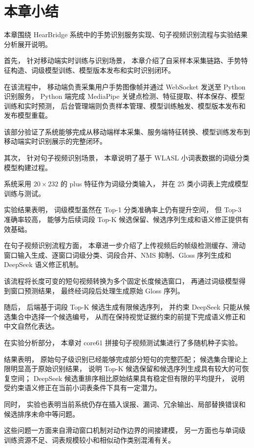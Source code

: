 
\section{本章小结}

本章围绕 HearBridge 系统中的手势识别服务实现、句子视频识别流程与实验结果分析展开说明。

首先，
针对移动端实时训练与识别场景，
本章介绍了自采样本采集链路、手势特征构造、词级模型训练、模型版本发布和实时识别闭环。

在该流程中，
移动端负责采集用户手势图像帧并通过 WebSocket 发送至 Python 识别服务，
Python 端完成 MediaPipe 关键点检测、特征提取、样本保存、模型训练和实时预测，
后台管理端则负责样本管理、模型训练触发、模型版本发布和发布模型重载。

该部分验证了系统能够完成从移动端样本采集、服务端特征转换、模型训练发布到移动端实时识别展示的完整闭环。

其次，
针对句子视频识别场景，
本章说明了基于 WLASL 小词表数据的词级分类模型构建过程。

系统采用 $20\times232$ 的 plus 特征作为词级分类输入，
并在 25 类小词表上完成模型训练与测试。

实验结果表明，
词级模型虽然在 Top-1 分类准确率上仍有提升空间，
但 Top-3 准确率较高，
能够为后续词段 Top-K 候选保留、候选序列生成和语义修正提供有效基础。

在句子视频识别流程方面，
本章进一步介绍了上传视频后的帧级检测缓存、滑动窗口输入生成、逐窗口词级分类、词段合并、NMS 抑制、Gloss 序列生成和 DeepSeek 语义修正机制。

该流程将长度可变的短句视频转换为多个固定长度候选窗口，
再通过词级模型得到窗口预测结果，
最终经词段后处理生成原始 Gloss 序列。

随后，
后端基于词段 Top-K 候选生成有限候选序列，
并约束 DeepSeek 只能从候选集合中选择一个候选编号，
从而在保持视觉证据约束的前提下完成语义修正和中文自然化表达。

在实验分析部分，
本章对 core61 拼接句子视频测试集进行了多随机种子实验。

结果表明，
原始句子级识别已经能够完成部分短句的完整匹配；
候选集合理论上限明显高于原始识别结果，
说明 Top-K 候选保留和候选序列生成具有较大的可恢复空间；
DeepSeek 候选重排序相比原始结果具有稳定但有限的平均提升，
说明受约束语义修正在当前小词表条件下具有一定潜力。

同时，
实验也表明当前系统仍存在插入误报、漏词、冗余输出、局部替换错误和候选排序未命中等问题。

这些问题一方面来自滑动窗口机制对动作边界的间接建模，
另一方面也与单词级训练资源不足、词表规模较小和相似动作类别混淆有关。

